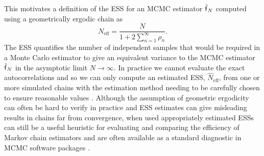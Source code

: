 This motivates a definition of the \ac{ESS} for an \ac{MCMC} estimator $\hatf_N$ computed using a geometrically ergodic chain as
\begin{equation}\label{eq:effective-sample-size-mcmc}
  N_{\textrm{eff}} = \frac{N}{1 + 2\sum_{n=1}^\infty \rho_n}.
\end{equation} 
The \ac{ESS} quantifies the number of independent samples that would be required in a Monte Carlo estimator to give an equivalent variance to the \ac{MCMC} estimator $\hatf_N$ in the asymptotic limit $N \to \infty$. In practice we cannot evaluate the exact autocorrelations and so we can only compute an estimated \ac{ESS}, $\hat{N}_{\textrm{eff}}$, from one or more simulated chains with the estimation method needing to be carefully chosen to ensure reasonable values \citep{thompson2010comparison}. Although the assumption of geometric ergodicity can often be hard to verify in practice and \ac{ESS} estimates can give misleading results in chains far from convergence, when used appropriately estimated \acp{ESS} can still be a useful heuristic for evaluating and comparing the efficiency of Markov chain estimators and are often available as a standard diagnostic in \ac{MCMC} software packages \citep{plummer2006coda,carpenter2016stan,salvatier2016probabilistic}.

